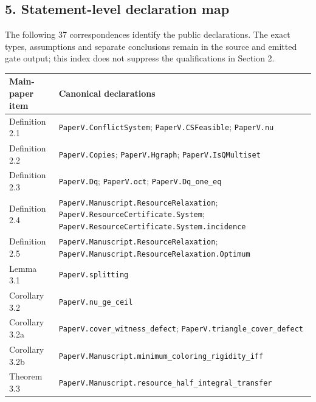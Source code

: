 \documentclass[english,11pt,a4paper]{article}
\newcounter{none}
\begin{document}
\subsection{5. Statement-level declaration
map}\label{statement-level-declaration-map}

The following 37 correspondences identify the public declarations. The
exact types, assumptions and separate conclusions remain in the source
and emitted gate output; this index does not suppress the qualifications
in Section 2.

{\def\LTcaptype{none} %
\begin{longtable}[]{@{}
  >{\raggedright\arraybackslash}p{}
  >{\raggedright\arraybackslash}p{}@{}}
\toprule\noalign{}
\begin{minipage}[b]{\linewidth}\raggedright
Main-paper item
\end{minipage} & \begin{minipage}[b]{\linewidth}\raggedright
Canonical declarations
\end{minipage} \\
\midrule\noalign{}
\endhead
\bottomrule\noalign{}
\endlastfoot
Definition 2.1 & \nolinkurl{PaperV.ConflictSystem};
\texttt{PaperV.CSFeasible}; \texttt{PaperV.nu} \\
Definition 2.2 & \texttt{PaperV.Copies}; \texttt{PaperV.Hgraph};
\nolinkurl{PaperV.IsQMultiset} \\
Definition 2.3 & \texttt{PaperV.Dq}; \texttt{PaperV.oct};
\nolinkurl{PaperV.Dq_one_eq} \\
Definition 2.4 & \nolinkurl{PaperV.Manuscript.ResourceRelaxation};
\nolinkurl{PaperV.ResourceCertificate.System};
\nolinkurl{PaperV.ResourceCertificate.System.incidence} \\
Definition 2.5 & \nolinkurl{PaperV.Manuscript.ResourceRelaxation};
\nolinkurl{PaperV.Manuscript.ResourceRelaxation.Optimum} \\
Lemma 3.1 & \texttt{PaperV.splitting} \\
Corollary 3.2 & \nolinkurl{PaperV.nu_ge_ceil} \\
Corollary 3.2a & \nolinkurl{PaperV.cover_witness_defect};
\nolinkurl{PaperV.triangle_cover_defect} \\
Corollary 3.2b &
\nolinkurl{PaperV.Manuscript.minimum_coloring_rigidity_iff} \\
Theorem 3.3 &
\nolinkurl{PaperV.Manuscript.resource_half_integral_transfer} \\

\end{longtable}}
\end{document}

